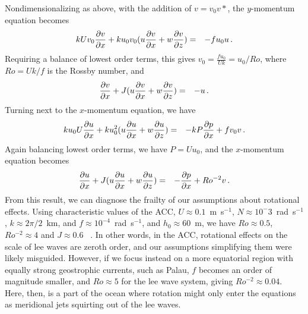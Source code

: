 \documentclass[12pt]{article}
\begin{document}
Nondimensionalizing as above, with the addition of $v = v_0 v*$, the $y$-momentum equation becomes
\begin{eqnarray*}
	kUv_0 \frac{\partial{v}}{\partial{x}} + ku_0v_0(u \frac{\partial{v}}{\partial{x}} + w \frac{\partial{v}}{\partial{z}}) &=& - fu_0u \,.\\
\end{eqnarray*}
Requiring a balance of lowest order terms, this gives $v_0 = \frac{fu_0}{Uk}=u_0/Ro$, where $Ro = Uk/f$ is the Rossby number, and
\begin{eqnarray*}
	 \frac{\partial{v}}{\partial{x}} + J(u \frac{\partial{v}}{\partial{x}} + w \frac{\partial{v}}{\partial{z}}) &=& - u \,.\\
\end{eqnarray*}
Turning next to the $x$-momentum equation, we have 
\begin{eqnarray*}
	k u_0 U \frac{\partial{u}}{\partial{x}} + k u_0^2( u\frac{\partial{u}}{\partial{x}} + w \frac{\partial{u}}{\partial{z}})  &=& -k P \frac{\partial{p}}{\partial{x}} + fv_0v\,.
\end{eqnarray*}
Again balancing lowest order terms, we have $P=Uu_0$, and the $x$-momentum equation becomes
\begin{eqnarray*}
	\frac{\partial{u}}{\partial{x}} +J( u\frac{\partial{u}}{\partial{x}} + w \frac{\partial{u}}{\partial{z}})  &=& -\frac{\partial{p}}{\partial{x}} + Ro^{-2}v\,.
\end{eqnarray*}	
From this result, we can diagnose the frailty of our assumptions about rotational effects. Using characteristic values of the ACC, $U \approx 0.1$~m~s$^{-1}$, $N \approx 10^-3$~rad~s$^{-1}$,  $k \approx 2\pi/2$~km, and $f\approx10^{-4}$~rad~s$^{-1}$, and $h_0\approx60$~m, we have $Ro \approx 0.5$, $Ro^{-2}\approx4$ and $J\approx 0.6$ ~\citep{Nikurashin2010a}. In other words, in the ACC, rotational effects on the scale of lee waves are zeroth order, and our assumptions simplifying them were likely misguided. However, if we focus instead on a more equatorial region with equally strong geostrophic currents, such as Palau, $f$ becomes an order of magnitude smaller, and $Ro\approx5$ for the lee wave system, giving $Ro^{-2}\approx 0.04$. Here, then, is a part of the ocean where rotation might only enter the equations as meridional jets squirting out of the lee waves.
	
	
	
	
	
\end{document}
